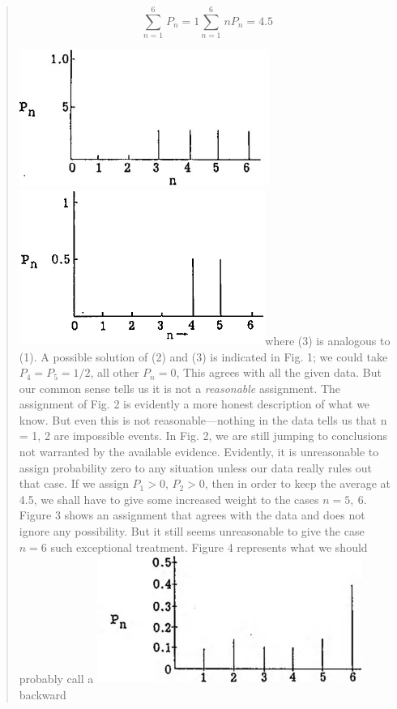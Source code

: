 \documentclass[]{article}
\begin{document}
\begin{quote}
\[{\sum_{n = 1}^{6}\mspace{2mu} P_{n} = 1
}{\sum_{n = 1}^{6}\mspace{2mu} nP_{n} = 4.5}\]

\includegraphics[width=3.20866in,height=1.75197in]{media/image1.jpeg}\includegraphics[width=3.16142in,height=2in]{media/image2.png}where
(3) is analogous to (1). A possible solution of (2) and (3) is indicated
in Fig. 1; we could take \(P_{4} = P_{5} = 1/2\), all other
\(P_{n} = 0\), This agrees with all the given data. But our common sense
tells us it is not a \emph{reasonable} assignment. The assignment of
Fig. 2 is evidently a more honest description of what we know. But even
this is not reasonable---nothing in the data tells us that n = 1, 2 are
impossible events. In Fig. 2, we are still jumping to conclusions not
warranted by the available evidence. Evidently, it is unreasonable to
assign probability zero to any situation unless our data really rules
out that case. If we assign \(P_{1} > 0\), \(P_{2} > 0\), then in order
to keep the average at 4.5, we shall have to give some increased weight
to the cases \(n = 5,\ 6\). Figure 3 shows an assignment that agrees
with the data and does not ignore any possibility. But it still seems
unreasonable to give the case \(n = 6\) such exceptional treatment.
Figure 4 represents what we should probably call a
\includegraphics[width=3.39764in,height=1.64567in]{media/image3.jpeg}backward

\end{quote}
\end{document}
